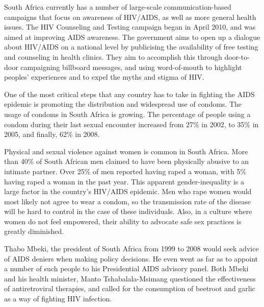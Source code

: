 \documentclass[12pt]{report}
\begin{document}
South Africa currently has a number of large-scale communication-based campaigns that focus on awareness of HIV/AIDS, as well as more general health issues.
The HIV Counseling and Testing campaign began in April 2010, and was aimed at improving AIDS awareness.
The government aims to open up a dialogue about HIV/AIDS on a national level by publicising the availability of free testing and counseling in health clinics.
They aim to accomplish this through door-to-door campaigning billboard messages, and using word-of-mouth to highlight peoples' experiences and to expel the myths and stigma of HIV.

One of the most critical steps that any country has to take in fighting the AIDS epidemic is promoting the distribution and widespread use of condoms.
The usage of condoms in South Africa is growing.  The percentage of people using a condom during their last sexual encounter increased from 27\% in 2002, to 35\% in 2005, and finally, 62\% in 2008\cite{shisana}.

Physical and sexual violence against women is common in South Africa. 
More than 40\% of South African men claimed to have been physically abusive to an intimate partner.
Over 25\% of men reported having raped a woman, with 5\% having raped a woman in the past year.
This apparent gender-inequality is a large factor in the country's HIV/AIDS epidemic.  
Men who rape women would most likely not agree to wear a condom, so the transmission rate of the disease will be hard to control in the case of these individuals.
Also, in a culture where women do not feel empowered, their ability to advocate safe sex practices is greatly diminished.

Thabo Mbeki, the president of South Africa from 1999 to 2008 would seek advice of AIDS deniers when making policy decisions.  
He even went as far as to appoint a number of such people to his Presidential AIDS advisory panel.  
Both Mbeki and his health minister, Manto Tshabalala-Msimang questioned the effectiveness of antiretroviral therapies, and called for the consumption of beetroot and garlic as a way of fighting HIV infection.
\end{document}
